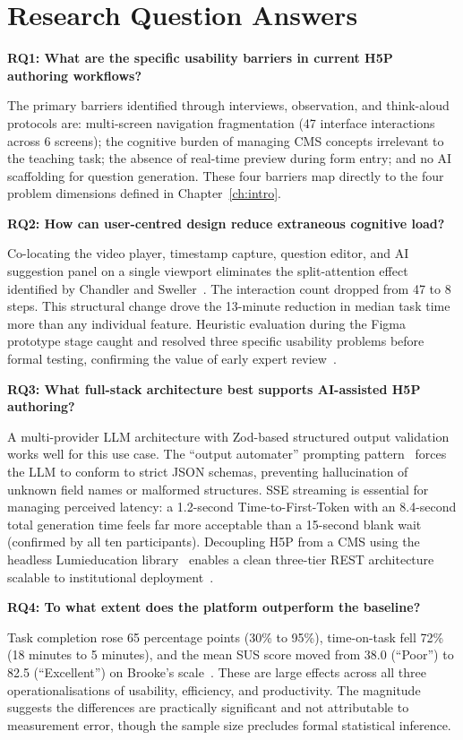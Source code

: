 \section{Research Question Answers}
\label{sec:rq_answers}

\textbf{RQ1: What are the specific usability barriers in current H5P authoring workflows?}

The primary barriers identified through interviews, observation, and think-aloud protocols are: multi-screen navigation fragmentation (47 interface interactions across 6 screens); the cognitive burden of managing CMS concepts irrelevant to the teaching task; the absence of real-time preview during form entry; and no AI scaffolding for question generation. These four barriers map directly to the four problem dimensions defined in Chapter~\ref{ch:intro}.

\textbf{RQ2: How can user-centred design reduce extraneous cognitive load?}

Co-locating the video player, timestamp capture, question editor, and AI suggestion panel on a single viewport eliminates the split-attention effect identified by Chandler and Sweller~\cite{chandler1991}. The interaction count dropped from 47 to 8 steps. This structural change drove the 13-minute reduction in median task time more than any individual feature. Heuristic evaluation during the Figma prototype stage caught and resolved three specific usability problems before formal testing, confirming the value of early expert review~\cite{molich1990}.

\textbf{RQ3: What full-stack architecture best supports AI-assisted H5P authoring?}

A multi-provider LLM architecture with Zod-based structured output validation works well for this use case. The ``output automater'' prompting pattern~\cite{white2023} forces the LLM to conform to strict JSON schemas, preventing hallucination of unknown field names or malformed structures. SSE streaming is essential for managing perceived latency: a 1.2-second Time-to-First-Token with an 8.4-second total generation time feels far more acceptable than a 15-second blank wait (confirmed by all ten participants). Decoupling H5P from a CMS using the headless Lumieducation library~\cite{lumieducation2023} enables a clean three-tier REST architecture scalable to institutional deployment~\cite{bass2012}.

\textbf{RQ4: To what extent does the platform outperform the baseline?}

Task completion rose 65 percentage points (30\% to 95\%), time-on-task fell 72\% (18 minutes to 5 minutes), and the mean SUS score moved from 38.0 (``Poor'') to 82.5 (``Excellent'') on Brooke's scale~\cite{brooke1996}. These are large effects across all three operationalisations of usability, efficiency, and productivity. The magnitude suggests the differences are practically significant and not attributable to measurement error, though the sample size precludes formal statistical inference.
